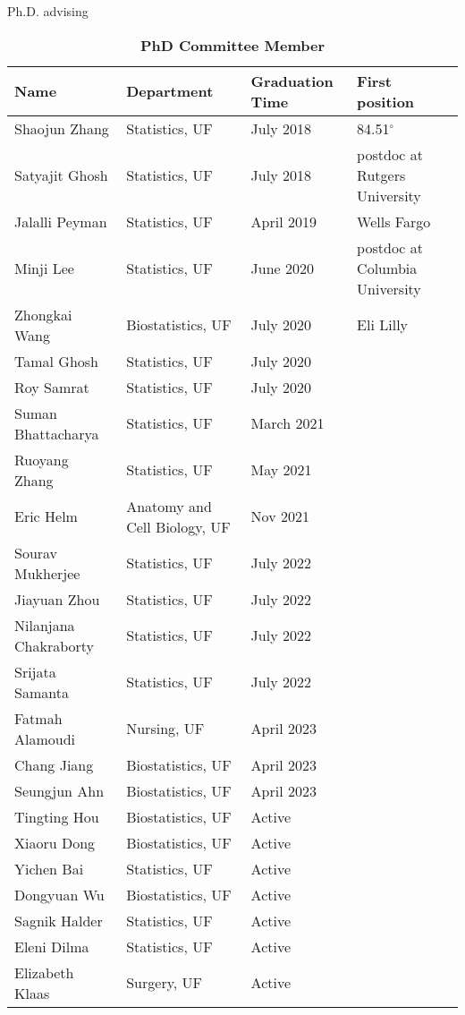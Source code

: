 \documentclass{resume} %
\begin{document}
\begin{rSection}{Ph.D. advising}
\begin{table}[htp]
\caption*{\textbf{PhD Committee Member}}
\begin{center}
\begin{tabular}{l l l l}
\hline
\hline
Name & Department & Graduation Time & First position \\
\hline
Shaojun Zhang & Statistics, UF & July 2018 & 84.51$^\circ$ \\
Satyajit Ghosh & Statistics, UF & July 2018 & postdoc at Rutgers University \\
Jalalli Peyman & Statistics, UF & April 2019 & Wells Fargo \\
Minji Lee & Statistics, UF & June 2020 &postdoc at Columbia University\\
Zhongkai Wang &  Biostatistics, UF & July 2020 & Eli Lilly \\
Tamal Ghosh & Statistics, UF & July 2020 & \\
Roy Samrat & Statistics, UF & July 2020 & \\
Suman Bhattacharya & Statistics, UF & March 2021 & \\
Ruoyang Zhang & Statistics, UF & May 2021 & \\
Eric Helm &  Anatomy and Cell Biology, UF & Nov 2021 & \\
Sourav Mukherjee & Statistics, UF & July 2022 & \\
Jiayuan Zhou & Statistics, UF & July 2022 & \\
Nilanjana Chakraborty & Statistics, UF & July 2022 & \\
Srijata Samanta & Statistics, UF & July 2022 & \\
Fatmah Alamoudi & Nursing, UF & April 2023 & \\
Chang Jiang & Biostatistics, UF & April 2023 & \\
Seungjun Ahn & Biostatistics, UF & April 2023 & \\
Tingting Hou & Biostatistics, UF & Active & \\
Xiaoru Dong & Biostatistics, UF & Active & \\
Yichen Bai & Statistics, UF & Active & \\
Dongyuan Wu & Biostatistics, UF & Active & \\
Sagnik Halder & Statistics, UF & Active & \\
Eleni Dilma & Statistics, UF & Active & \\
Elizabeth Klaas & Surgery, UF & Active & \\
\hline
\hline
\end{tabular}
\end{center}
\label{default}
\end{table}%

\end{rSection}
\end{document}
